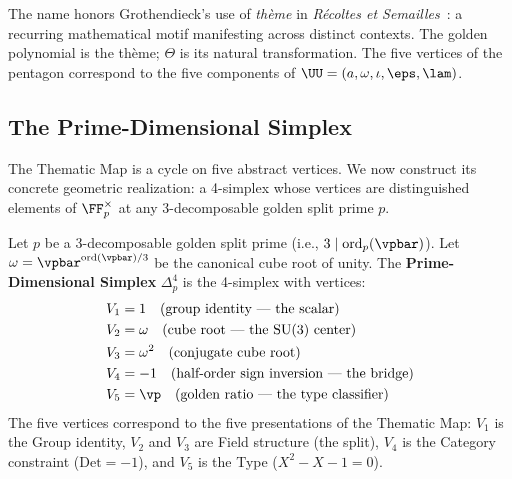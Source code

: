 \begin{remark}
The name honors Grothendieck's use of \emph{th\`eme} in \emph{R\'ecoltes et Semailles}~\cite{grothendieck-rs}: a recurring mathematical motif manifesting across distinct contexts. The golden polynomial is the th\`eme; $\Theta$ is its natural transformation. The five vertices of the pentagon correspond to the five components of $\UU = (a, \omega, \iota, \eps, \lam)$.
\end{remark}

\subsection{The Prime-Dimensional Simplex}

The Thematic Map is a cycle on five abstract vertices. We now construct its concrete geometric realization: a 4-simplex whose vertices are distinguished elements of $\FF_p^\times$ at any 3-decomposable golden split prime $p$.

\begin{definition}\label{def:simplex}
Let $p$ be a 3-decomposable golden split prime (i.e., $3 \mid \mathrm{ord}_p(\vpbar)$). Let $\omega = \vpbar^{\mathrm{ord}(\vpbar)/3}$ be the canonical cube root of unity. The \textbf{Prime-Dimensional Simplex} $\Delta^4_p$ is the 4-simplex with vertices:
\begin{align}
V_1 &= 1 \quad \text{(group identity --- the scalar)} \\
V_2 &= \omega \quad \text{(cube root --- the SU(3) center)} \\
V_3 &= \omega^2 \quad \text{(conjugate cube root)} \\
V_4 &= -1 \quad \text{(half-order sign inversion --- the bridge)} \\
V_5 &= \vp \quad \text{(golden ratio --- the type classifier)}
\end{align}
The five vertices correspond to the five presentations of the Thematic Map: $V_1$ is the Group identity, $V_2$ and $V_3$ are Field structure (the split), $V_4$ is the Category constraint ($\mathrm{Det} = -1$), and $V_5$ is the Type ($X^2 - X - 1 = 0$).
\end{definition}

